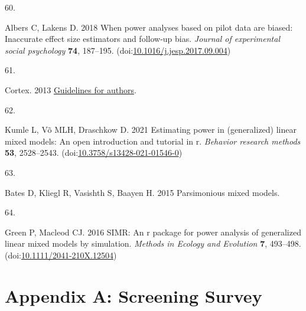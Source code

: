 \documentclass[
]{article}
\newlength{\cslhangindent}
\newlength{\csllabelwidth}
\newlength{\cslentryspacingunit} %
\newenvironment{CSLReferences}[2] %
 {%
  \setlength{\parindent}{0pt}
  \ifodd #1
  \let\oldpar\par
  \def\par{\hangindent=\cslhangindent\oldpar}
  \fi
  \setlength{\parskip}{#2\cslentryspacingunit}
 }%
 {}
\newcommand{\CSLLeftMargin}[1]{\parbox[t]{\csllabelwidth}{#1}}
\newcommand{\CSLRightInline}[1]{\parbox[t]{\linewidth - \csllabelwidth}{#1}\break}
\begin{document}
\begin{CSLReferences}{0}{0}
\leavevmode{}%
\CSLLeftMargin{60. }%
\CSLRightInline{Albers C, Lakens D. 2018 When power analyses based on pilot data are biased: Inaccurate effect size estimators and follow-up bias. \emph{Journal of experimental social psychology} \textbf{74}, 187--195. (doi:\href{https://doi.org/10.1016/j.jesp.2017.09.004}{10.1016/j.jesp.2017.09.004})}

\leavevmode{}%
\CSLLeftMargin{61. }%
\CSLRightInline{Cortex. 2013 \href{https://www.elsevier.com/__data/promis_misc/PROMIS\%20pub_idt_CORTEX\%20Guidelines_RR_29_04_2013.pdf}{Guidelines for authors}. }

\leavevmode{}%
\CSLLeftMargin{62. }%
\CSLRightInline{Kumle L, Võ MLH, Draschkow D. 2021 Estimating power in (generalized) linear mixed models: An open introduction and tutorial in r. \emph{Behavior research methods} \textbf{53}, 2528--2543. (doi:\href{https://doi.org/10.3758/s13428-021-01546-0}{10.3758/s13428-021-01546-0})}

\leavevmode{}%
\CSLLeftMargin{63. }%
\CSLRightInline{Bates D, Kliegl R, Vasishth S, Baayen H. 2015 Parsimonious mixed models. }

\leavevmode{}%
\CSLLeftMargin{64. }%
\CSLRightInline{Green P, Macleod CJ. 2016 SIMR: An r package for power analysis of generalized linear mixed models by simulation. \emph{Methods in Ecology and Evolution} \textbf{7}, 493--498. (doi:\href{https://doi.org/10.1111/2041-210X.12504}{10.1111/2041-210X.12504})}

\end{CSLReferences}

\hypertarget{appendix-a-screening-survey}{%
\section*{Appendix A: Screening Survey}\label{appendix-a-screening-survey}}
\end{document}
